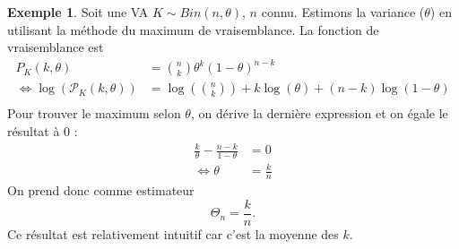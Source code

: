 \documentclass[a4paper,12pt]{report}
\theoremstyle{definition}
\renewcommand{\(}{\left(}
\renewcommand{\)}{\right)}
\renewcommand{\P}{\mathcal{P}}
\newtheorem{exmp}[thm]{Exemple}
\begin{document}
        \begin{exmp}
            \label{exest2}
            Soit une VA $K\sim Bin(n,\theta)$, $n$ connu. Estimons la variance ($\theta$) en utilisant la méthode du maximum de vraisemblance. La fonction de vraisemblance est
            \begin{align*}
                P_K(k,\theta) &= {n\choose k}\theta^k (1-\theta)^{n-k} \\
                \Leftrightarrow \log(\P_K(k,\theta)) &= \log\left( {n\choose k} \right)+k\log(\theta)+(n-k)\log(1-\theta) \\
            \end{align*}
            Pour trouver le maximum selon $\theta$, on dérive la dernière expression et on égale le résultat à 0 :
            \begin{align*}
                \frac{k}{\theta}-\frac{n-k}{1-\theta} &= 0 \\
                \Leftrightarrow \theta &= \frac{k}{n}
            \end{align*}
            On prend donc comme estimateur
            $$\Theta_n = \frac{k}{n}.$$
            Ce résultat est relativement intuitif car c'est la moyenne des $k$.
        \end{exmp}
        
\end{document}

